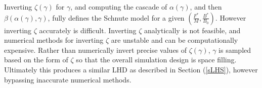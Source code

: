 Inverting $\zeta(\gamma)$ for $\gamma$, and computing the cascade of
$\alpha(\gamma)$, and then $\beta(\alpha(\gamma), \gamma)$, fully defines the
Schnute model for a given $(\frac{F^*}{M}, \frac{B^*}{B_0})$. However
inverting $\zeta$ accurately is difficult. Inverting $\zeta$ %
analytically is not feasible, and numerical methods for inverting
$\zeta$ are unstable and can be computationally expensive.
%
Rather than numerically invert precise values of $\zeta(\gamma)$, $\gamma$ is 
sampled based on the form of $\zeta$ so that the overall simulation 
design is space filling. Ultimately this produces a similar LHD as described in 
Section (\ref{sLHS}), however bypassing inaccurate numerical methods. 

